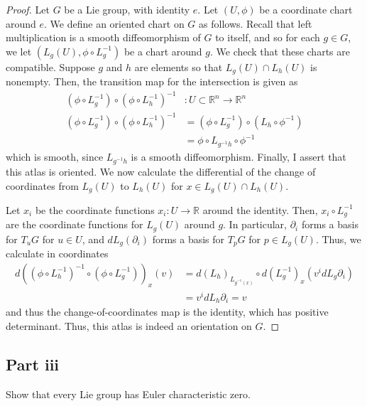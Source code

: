 \documentclass[fontsize=11pt]{scrartcl} %
\numberwithin{equation}{section} %
\numberwithin{figure}{section} %
\numberwithin{table}{section} %
\newcommand{\R}{\mathbb{R}}
\begin{document}
\begin{proof}
    Let $G$ be a Lie group, with identity $e$. Let $(U,\phi)$ be a coordinate
    chart around $e$. We define an oriented chart on $G$ as follows. Recall that
    left multiplication is a smooth diffeomorphism of $G$ to itself, and so for
    each $g\in G$, we let $(L_g(U),\phi\circ L_g^{-1})$ be a chart around $g$.
    We check that these charts are compatible. Suppose $g$ and $h$ are elements
    so that $L_g(U)\cap L_h(U)$ is nonempty. Then, the transition map for the
    intersection is given as
    \[
        \begin{aligned}
            (\phi\circ L_g^{-1})\circ(\phi\circ L_h^{-1})^{-1}&:U\subset\R^n\to \R^n\\
            (\phi\circ L_g^{-1})\circ(\phi\circ L_h^{-1})^{-1}
            &= (\phi\circ L_g^{-1})\circ(L_h\circ \phi^{-1})\\
            &=\phi\circ L_{g^{-1}h}\circ\phi^{-1}
        \end{aligned}
    \]
    which is smooth, since $L_{g^{-1}h}$ is a smooth diffeomorphism. Finally, I
    assert that this atlas is oriented. We now calculate the differential of the
    change of coordinates from $L_g(U)$ to $L_h(U)$ for $x\in L_g(U)\cap
    L_h(U)$.

    Let $x_i$ be the coordinate functions $x_i:U\to \R$ around the identity.
    Then, $x_i\circ L_g^{-1}$ are the coordinate functions for $L_g(U)$ around
    $g$. In particular, $\partial_i$ forms a basis for $T_uG$ for $u\in U$, and
    $dL_g(\partial_i)$ forms a basis for $T_pG$ for $p\in L_g(U)$. Thus, we
    calculate in coordinates
    \[
        \begin{aligned}
        d((\phi\circ L_h^{-1})^{-1}\circ (\phi\circ
        L_g^{-1}))_x(v)
        &= d(L_h)_{L_{g^{-1}(x)}}\circ d(L_g^{-1})_x(v^idL_g\partial_i)\\
        &=v^idL_h\partial_i = v
        \end{aligned}
    \]
    and thus the change-of-coordinates map is the identity, which has positive
    determinant. Thus, this atlas is indeed an orientation on $G$.

\end{proof}

\subsection*{Part iii}
Show that every Lie group has Euler characteristic zero.
\end{document}
